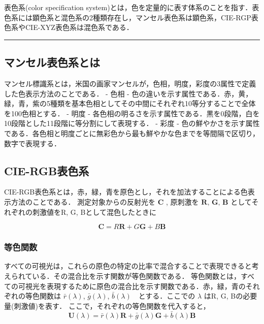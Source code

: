 \documentclass[
]{article}
\author{}
\date{}
\begin{document}
表色系(color specification
system)とは，色を定量的に表す体系のことを指す．表色系には顕色系と混色系の2種類存在し，マンセル表色系は顕色系，CIE-RGP表色系やCIE-XYZ表色系は混色系である．

\begin{center}\rule{0.5\linewidth}{0.5pt}\end{center}

\hypertarget{ux30deux30f3ux30bbux30ebux8868ux8272ux7cfbux3068ux306f}{%
\subsection{マンセル表色系とは}\label{ux30deux30f3ux30bbux30ebux8868ux8272ux7cfbux3068ux306f}}

マンセル標識系とは，米国の画家マンセルが，色相，明度，彩度の3属性で定義した色表示方法のことである．
- 色相 -
色の違いを示す属性である．赤，黄，緑，青，紫の5種類を基本色相としてその中間にそれぞれ10等分することで全体を100色相とする．
- 明度 -
各色相の明るさを示す属性である．黒を0段階，白を10段階とした11段階に等分割にして表現する．
- 彩度 -
色の鮮やかさを示す属性である．各色相と明度ごとに無彩色から最も鮮やかな色までを等間隔で区切り，数字で表現する．

\hypertarget{cie-rgbux8868ux8272ux7cfb}{%
\subsection{CIE-RGB表色系}\label{cie-rgbux8868ux8272ux7cfb}}

CIE-RGB表色系とは，赤，緑，青を原色とし，それを加法することによる色表示方法のことである．
測定対象からの反射光を \(\textbf{C}\) , 原刺激を \(\textbf{R, G, B}\)
としてそれぞれの刺激値をR, G, Bとして混色したときに

\begin{equation}
\textbf{C} = R\textbf{R} + G\textbf{G} + B\textbf{B}
\end{equation}

\hypertarget{ux7b49ux8272ux95a2ux6570}{%
\subsubsection{等色関数}\label{ux7b49ux8272ux95a2ux6570}}

すべての可視光は，これらの原色の特定の比率で混合することで表現できると考えられている．その混合比を示す関数が等色関数である．
等色関数とは，すべての可視光を表現するために原色の混合比を示す関数である．赤，緑，青のそれぞれの等色関数は
\(\bar{r}(\lambda)\), \(\bar{g}(\lambda)\),
\(\bar{b}(\lambda)\)　とする．ここでの \(\lambda\) はR, G,
Bの必要量(刺激値)を表す． ここで，それぞれの等色関数を代入すると，
\begin{equation}
\textbf{U}(\lambda) = \bar{r}(\lambda)\textbf{R} + \bar{g}(\lambda)\textbf{G} + \bar{b}(\lambda)\textbf{B} \tag{2}
\end{equation}
\end{document}
